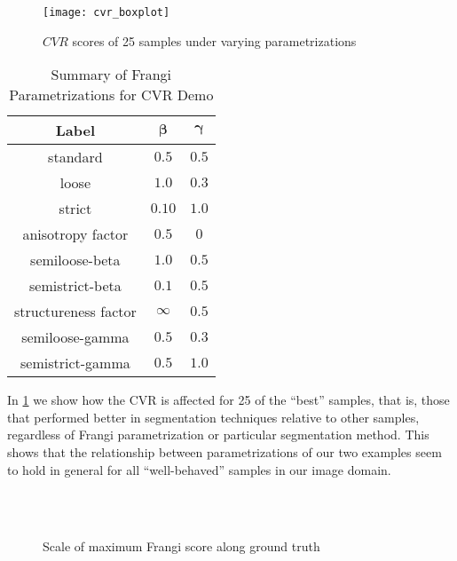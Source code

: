 \begin{figure}[p]\centering
	\texttt{[image: cvr\_boxplot]}
	\caption{$CVR$ scores of 25 samples under varying parametrizations}
  \label{fig:CVR-boxplot-quality0}
\end{figure}

\begin{table}[p]\centering
	\begin{tabular}{|c|c|c|}
		\hline
		\textbf{Label}  & $\bm{\beta}$ & $\bm{\gamma}$ \\ \hline
		standard & $0.5$ & $0.5$ \\ \hline
		loose & $ 1.0$ & $0.3$ \\ \hline
		strict & $0.10$ & $1.0$ \\ \hline
		anisotropy factor & $ 0.5$& $0$ \\ \hline
		semiloose-beta &$ 1.0$ & $0.5$ \\ \hline
		semistrict-beta& $ 0.1$ &$ 0.5$ \\ \hline
		structureness factor& $ \infty$ & $0.5$ \\ \hline
		semiloose-gamma &$ 0.5$ & $0.3$ \\ \hline
		semistrict-gamma& $ 0.5$ & $1.0$ \\ \hline
	\end{tabular}
	\caption{Summary of Frangi Parametrizations for CVR Demo} 
	\label{tab:cvr-demo-parametrizations}
\end{table}

In \cref{fig:CVR-boxplot-quality0} we show how the CVR is affected for 25 of the ``best'' samples, that is, those that performed better in segmentation techniques relative to other samples, regardless of Frangi parametrization or particular segmentation method. This shows that the relationship between parametrizations of our two examples seem to hold in general for all ``well-behaved'' samples in our image domain.

\begin{figure}[p]\centering
	 \\
	 \\
  \caption{Scale of maximum Frangi score along ground truth}
  \label{fig:Vargmax}
\end{figure}



